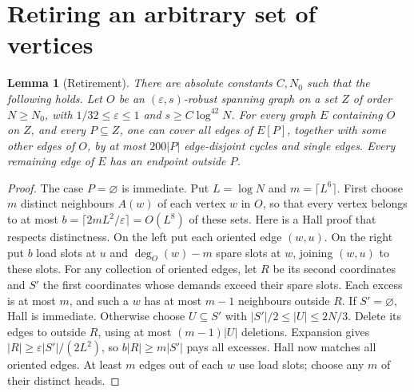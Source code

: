 \documentclass[11pt]{article}
\newtheorem{lemma}[theorem]{Lemma}
\theoremstyle{remark}\newtheorem*{remark}{Remark}
\newcommand{\eps}{\varepsilon}
\begin{document}
\section{Retiring an arbitrary set of vertices}
\begin{lemma}[Retirement]\label{lem:retire}
There are absolute constants $C,N_0$ such that the following holds.
Let $O$ be an $(\eps,s)$-robust spanning graph on a set $Z$ of order
$N\ge N_0$, with $1/32\le\eps\le1$ and $s\ge C\log^{42}N$.
For every graph $E$ containing $O$ on $Z$, and every $P\subseteq Z$,
one can cover all edges of $E[P]$, together with some other edges of $O$,
by at most $200|P|$ edge-disjoint cycles and single edges.
Every remaining edge of $E$ has an endpoint outside $P$.
\end{lemma}
\begin{proof}
The case $P=\varnothing$ is immediate. Put $L=\log N$ and $m=\lceil L^6\rceil$.
First choose $m$ distinct neighbours $A(w)$ of each vertex $w$ in $O$,
so that every vertex belongs to at most
$b=\lceil2mL^2/\eps\rceil=O(L^8)$ of these sets.
Here is a Hall proof that respects distinctness. On the left put each
oriented edge $(w,u)$. On the right put $b$ load slots at $u$ and
$\deg_O(w)-m$ spare slots at $w$, joining $(w,u)$ to these slots.
For any collection of oriented edges, let $R$ be its second coordinates
and $S'$ the first coordinates whose demands exceed their spare slots.
Each excess is at most $m$, and such a $w$ has at most $m-1$ neighbours
outside $R$. If $S'=\varnothing$, Hall is immediate. Otherwise choose
$U\subseteq S'$ with $|S'|/2\le|U|\le2N/3$.
Delete its edges to outside $R$, using at most $(m-1)|U|$ deletions.
Expansion gives $|R|\ge\eps|S'|/(2L^2)$, so $b|R|\ge m|S'|$ pays
all excesses. Hall now matches all oriented edges. At least $m$ edges
out of each $w$ use load slots; choose any $m$ of their distinct heads.


\end{proof}
\end{document}
